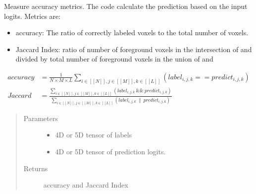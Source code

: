 \documentclass[letterpaper,10pt,english]{sphinxmanual}
\begin{document}
\begin{fulllineitems}
\label{\detokenize{index:unet.ops.accuracy}}
Measure accuracy metrics. The code calculate the prediction based on the input logits. Metrics are:
\begin{itemize}
\item {} 
accuracy: The ratio of correctly labeled voxels to the total number of voxels.

\item {} 
Jaccard Index: ratio of number of foreground voxels in the intersection of  and  divided by
total number of foreground voxels in the union of  and 

\end{itemize}
\begin{equation*}
\begin{split}accuracy &= \frac{1}{N \times M \times L} \sum_{i \in [[N]],  j \in [[M]],  k \in [[L]]} (
    label_{i,j,k} == predict_{i,j,k}) \\
Jaccard &= \frac{
    \sum_{i \in [[N]],  j \in [[M]],  k \in [[L]]} (label_{i,j,k} \  \&\& \  predict_{i,j,k})
}{
    \sum_{i \in [[N]],  j \in [[M]],  k \in [[L]]} (label_{i,j,k} \  \| \  predict_{i,j,k})
}\end{split}
\end{equation*}\begin{quote}\begin{description}
\item[{Parameters}] \leavevmode\begin{itemize}
\item {} 
 \textendash{} 4D or 5D tensor of labels

\item {} 
 \textendash{} 4D or 5D tensor of prediction logits.

\end{itemize}

\item[{Returns}] \leavevmode
accuracy and Jaccard Index

\end{description}\end{quote}

\end{fulllineitems}
\end{document}
